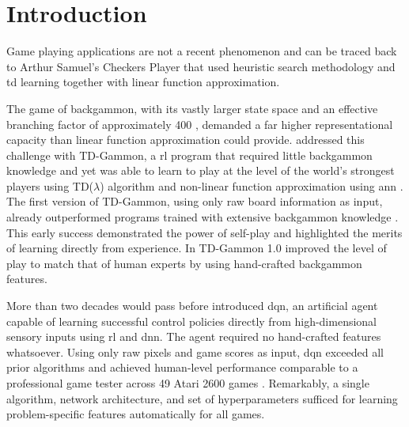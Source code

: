 \chapter{Introduction}
\label{chap:introduction}

Game playing applications are not a recent phenomenon and can be traced back to Arthur Samuel's Checkers Player \citep{samuelStudiesMachineLearning1959} that used heuristic search methodology and \acrfull{td} learning \citep[p.~121]{suttonReinforcementLearningIntroduction2020} together with linear function approximation. 

The game of backgammon, with its vastly larger state space and an effective branching factor of approximately 400 \citep[p.~422]{suttonReinforcementLearningIntroduction2020}, demanded a far higher representational capacity than linear function approximation could provide. \citet{tesauroTDGammonSelfTeachingBackgammon1994} addressed this challenge with TD-Gammon, a \acrfull{rl} program that required little backgammon knowledge and yet was able to learn to play at the level of the world's strongest players using TD($\lambda$) algorithm and non-linear function approximation using \acrfull{ann} \citep[p.~421]{suttonReinforcementLearningIntroduction2020}. The first version of TD-Gammon, using only raw board information as input, already outperformed programs trained with extensive backgammon knowledge \citep[p.~266]{tesauroPracticalIssuesTemporal1992}. This early success demonstrated the power of self-play and highlighted the merits of learning directly from experience. In TD-Gammon 1.0 \citet[p.~20]{tesauroTDGammonSelfTeachingBackgammon1994} improved the level of play to match that of human experts by using hand-crafted backgammon features.

More than two decades would pass before \citet[p.~529]{mnihHumanlevelControlDeep2015} introduced \acrfull{dqn}, an artificial agent capable of learning successful control policies directly from high-dimensional sensory inputs using \acrshort{rl} and \acrfull{dnn}. The agent required no hand-crafted features whatsoever. Using only raw pixels and game scores as input, \acrshort{dqn} exceeded all prior algorithms and achieved human-level performance comparable to a professional game tester across 49 Atari 2600 games \citep[Figure~3]{mnihHumanlevelControlDeep2015}. Remarkably, a single algorithm, network architecture, and set of hyperparameters sufficed for learning problem-specific features automatically for all games.

